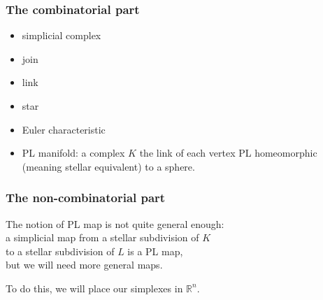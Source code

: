 \documentclass[14pt]{beamer}
\newcommand{\setbackgroundpicture}[1]{%
\usebackgroundtemplate{
\begin{pgfpicture}{0in}{0in}{\paperwidth}{\paperheight}
\pgfputat{\pgfxy(0,0)}{\texttt{[image: \#1]}}
\color{white}
\pgfsetfillopacity{0.8}
\pgfrect[fill]{\pgfxy(0,0)}{\pgfpoint{\paperwidth}{\paperheight}}
\end{pgfpicture}
}
}
\newcommand{\clearbackgroundpicture}{\usebackgroundtemplate{}}
\begin{document}







  

\begin{frame}
\frametitle{The combinatorial part}

\begin{itemize}
\item  simplicial complex
\item  join
\item  link
\item  star
\item  Euler characteristic
\item PL manifold: a complex $K$ the link of each vertex PL
  homeomorphic (meaning stellar equivalent) to a sphere.
\end{itemize}

\end{frame}

\begin{frame}
\frametitle{The non-combinatorial part}

The notion of PL map is not quite general enough:\\
a simplicial map from a stellar subdivision of $K$ \\
to a stellar subdivision of $L$ is a PL map, \\
but we will need more general maps.

\vfill

To do this, we will place our simplexes in $\mathbb{R}^n$.

\end{frame}
\end{document}

